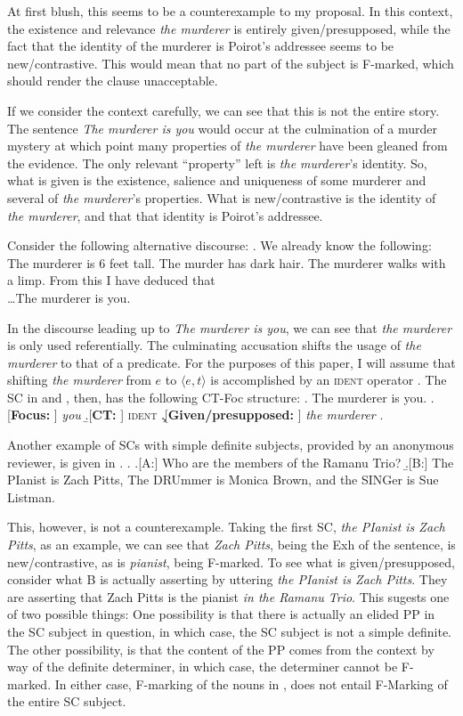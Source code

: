 \documentclass[letterpaper]{article}
\begin{document}
At first blush, this seems to be a counterexample to my proposal.
In this context, the existence and relevance \textit{the murderer} is entirely given/presupposed, while the fact that the identity of the murderer is Poirot's addressee seems to be new/contrastive. 
This would mean that no part of the subject is F-marked, which should render the clause unacceptable.

If we consider the context carefully, we can see that this is not the entire story.
The sentence \textit{The murderer is you} would occur at the culmination of a murder mystery at which point many properties of \textit{the murderer} have been gleaned from the evidence.
The only relevant ``property'' left is \textit{the murderer}'s identity.
So, what is given is the existence, salience and uniqueness of  some murderer and several of \textit{the murderer}'s properties.
What is new/contrastive is the identity of \textit{the murderer}, and that that identity is Poirot's addressee.

Consider the following alternative discourse:
\ex. We already know the following: The murderer is 6 feet tall. The murder has dark hair. The murderer walks with a limp. From this I have deduced that \\
\ldots The murderer is you.

In the discourse leading up to \textit{The murderer is you}, we can see that \textit{the murderer} is only used referentially.
The culminating accusation shifts the usage of \textit{the murderer} to that of a predicate.
For the purposes of this paper, I will assume that shifting \textit{the murderer} from $e$ to $\langle e, t\rangle$ is accomplished by an \textsc{ident} operator \parencite[cf.][]{partee1987noun}.
The SC in \Last and \LLast, then, has the following CT-Foc structure:
\ex. The murderer is you.
\a.[\textbf{Focus: }] \textit{you}
\b.[\textbf{CT: }] \textsc{ident}
\c.[\textbf{Given/presupposed:} ] \textit{the murderer}
\z.

Another example of SCs with simple definite subjects, provided by an anonymous reviewer, is given in \Next.
\ex. 
\a.[A:] Who are the members of the Ramanu Trio?
\b.[B:] The PIanist is Zach Pitts, The DRUmmer is Monica Brown, and the SINGer is Sue Listman.

This, however, is not a counterexample.
Taking the first SC, \textit{the PIanist is Zach Pitts}, as an example, we can see that \textit{Zach Pitts}, being the Exh of the sentence, is new/contrastive, as is \textit{pianist}, being F-marked.
To see what is given/presupposed, consider what B is actually asserting by uttering \textit{the PIanist is Zach Pitts}.
They are asserting that Zach Pitts is the pianist \textit{in the Ramanu Trio}.
This sugests one of two possible things:
One possibility is that there is actually an elided PP in the SC subject in question, in which case, the SC subject is not a simple definite.
The other possibility, is that the content of the PP comes from the context by way of the definite determiner, in which case, the determiner cannot be F-marked.
In either case, F-marking of the nouns in \Last, does not entail F-Marking of the entire SC subject.
\end{document}
